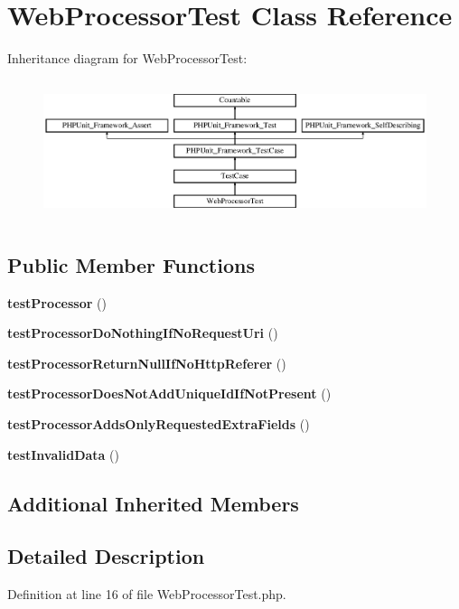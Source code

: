 \section{Web\+Processor\+Test Class Reference}
\label{class_monolog_1_1_processor_1_1_web_processor_test}
Inheritance diagram for Web\+Processor\+Test\+:\begin{figure}[H]
\begin{center}
\leavevmode
\includegraphics[height=4.129793cm]{class_monolog_1_1_processor_1_1_web_processor_test}
\end{center}
\end{figure}
\subsection*{Public Member Functions}
\begin{DoxyCompactItemize}
\item 
{\bf test\+Processor} ()
\item 
{\bf test\+Processor\+Do\+Nothing\+If\+No\+Request\+Uri} ()
\item 
{\bf test\+Processor\+Return\+Null\+If\+No\+Http\+Referer} ()
\item 
{\bf test\+Processor\+Does\+Not\+Add\+Unique\+Id\+If\+Not\+Present} ()
\item 
{\bf test\+Processor\+Adds\+Only\+Requested\+Extra\+Fields} ()
\item 
{\bf test\+Invalid\+Data} ()
\end{DoxyCompactItemize}
\subsection*{Additional Inherited Members}


\subsection{Detailed Description}


Definition at line 16 of file Web\+Processor\+Test.\+php.



